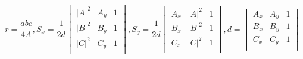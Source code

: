 \documentclass[12pt]{article}
\begin{document}
\[
    r = \frac{abc}{4A}, S_x = \frac{1}{2d} \begin{vmatrix}
        |A|^2 & A_y & 1 \\
        |B|^2 & B_y & 1 \\
        |C|^2 & C_y & 1 \\
    \end{vmatrix}, S_y = \frac{1}{2d} \begin{vmatrix}
        A_x & |A|^2 & 1 \\
        B_x & |B|^2 & 1 \\
        C_x & |C|^2 & 1 \\
    \end{vmatrix}, d = \begin{vmatrix}
        A_x & A_y & 1 \\
        B_x & B_y & 1 \\
        C_x & C_y & 1 \\
    \end{vmatrix}
\
\]
\end{document}
